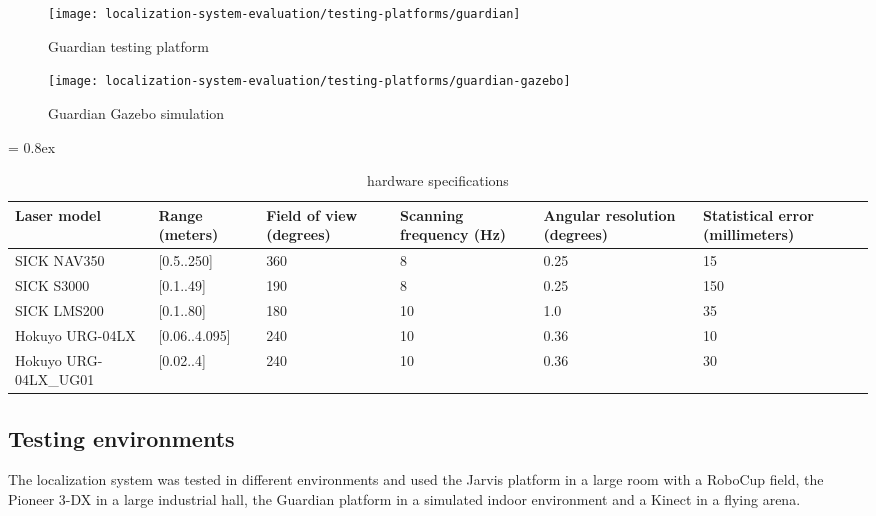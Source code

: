 \begin{figure}[ht]
	\centering
	\begin{minipage}[ht]{0.24\textwidth}
		\centering
		\texttt{[image: localization-system-evaluation/testing-platforms/guardian]}
		\caption{Guardian testing platform}
		\label{fig:localization-system-evaluation_guardian}
	\end{minipage}\hfill
	\begin{minipage}[ht]{0.24\textwidth}
		\centering
		\texttt{[image: localization-system-evaluation/testing-platforms/guardian-gazebo]}
		\caption{Guardian Gazebo simulation}
		\label{fig:localization-system-evaluation_guardian_gazebo}
	\end{minipage}
\end{figure}


\begin{table*}[t]
	\caption{ hardware specifications}
	\tabulinesep = 0.8ex
	\centering
	\small
	\begin{tabu} { X[2.5,m,c] | X[m,c] X[m,c] X[m,c] X[m,c] X[m,c] }
		\rowfont{\bfseries\itshape\small} Laser model & Range (meters) & Field of view (degrees) & Scanning frequency (Hz) & Angular resolution (degrees) & Statistical error (millimeters) \\
		\hline
		{\small SICK NAV350} 			& [0.5..250] 	& 360 	& 8 	& 0.25 	& 15 	\\
		{\small SICK S3000} 			& [0.1..49] 	& 190 	& 8 	& 0.25 	& 150 	\\
		{\small SICK LMS200} 			& [0.1..80] 	& 180 	& 10 	& 1.0 	& 35 	\\
		{\small Hokuyo URG-04LX} 		& [0.06..4.095] & 240 	& 10 	& 0.36 	& 10 	\\
		{\small Hokuyo URG-04LX\_UG01} 	& [0.02..4] 	& 240 	& 10 	& 0.36 	& 30 	\\
	\end{tabu}
	\label{tab:localization-system-evaluation_laser-hardware-specifications}
\end{table*}



\subsection{Testing environments}

The localization system was tested in different environments and used the Jarvis platform in a large room with a RoboCup field, the Pioneer 3-DX in a large industrial hall, the Guardian platform in a simulated indoor environment and a Kinect in a flying arena.



